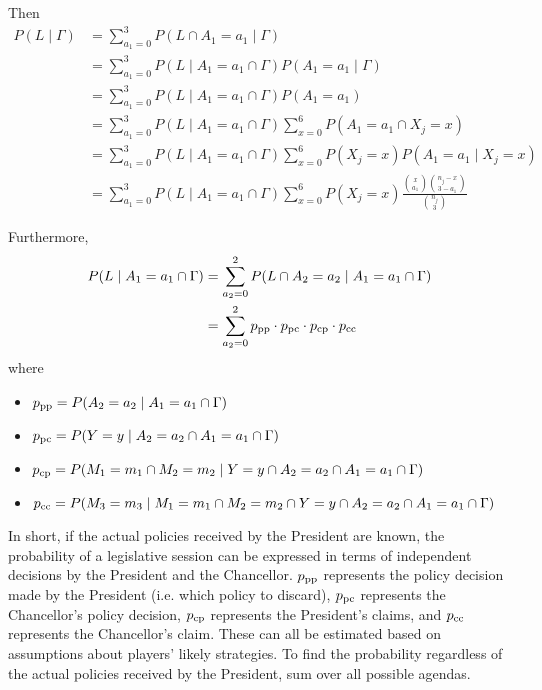 \documentclass[fleqn, 12pt, letterpaper]{article}
\newcommand{\up}[1]{\textnormal{#1}}
\begin{document}
Then
\begin{align*}
	P(L \mid \Gamma)
		&= \sum_{a_1=0}^3 P(L \cap A_1=a_1 \mid \Gamma) \\
		&= \sum_{a_1=0}^3 P(L \mid A_1=a_1 \cap \Gamma) P(A_1=a_1 \mid \Gamma) \\
		&= \sum_{a_1=0}^3 P(L \mid A_1=a_1 \cap \Gamma) P(A_1=a_1) \\
		&= \sum_{a_1=0}^3 P(L \mid A_1=a_1 \cap \Gamma) \sum_{x=0}^6 P(A_1=a_1 \cap X_j=x) \\
		&= \sum_{a_1=0}^3 P(L \mid A_1=a_1 \cap \Gamma) \sum_{x=0}^6 P(X_j=x) P(A_1=a_1 \mid X_j=x) \\
		&= \sum_{a_1=0}^3 P(L \mid A_1=a_1 \cap \Gamma) \sum_{x=0}^6 P(X_j=x) \frac{\binom{x}{a_1} \binom{n_j-x}{3-a_1}}{\binom{n_j}{3}}
\end{align*}

Furthermore,
\begin{align*}
	P(L \mid A_1=a_1 \cap \Gamma)
		&= \sum_{a_2=0}^2 P(L \cap A_2=a_2 \mid A_1=a_1 \cap \Gamma) \\
		&= \sum_{a_2=0}^2 p_\up{pp} \cdot p_\up{pc} \cdot p_\up{cp} \cdot p_\up{cc}
\end{align*}
where
\begin{itemize}
	\item $p_\up{pp} = P(A_2=a_2 \mid A_1=a_1 \cap \Gamma)$
	\item $p_\up{pc} = P(Y=y \mid A_2=a_2 \cap A_1=a_1 \cap \Gamma)$
	\item $p_\up{cp} = P(M_1=m_1 \cap M_2=m_2 \mid Y=y \cap A_2=a_2 \cap A_1=a_1 \cap \Gamma)$
	\item $p_\up{cc} = P(M_3=m_3 \mid M_1=m_1 \cap M_2=m_2 \cap Y=y \cap A_2=a_2 \cap A_1=a_1 \cap \Gamma)$
\end{itemize}

In short, if the actual policies received by the President are known, the probability of a legislative session can be expressed in terms of independent decisions by the President and the Chancellor. $p_\up{pp}$ represents the policy decision made by the President (i.e. which policy to discard), $p_\up{pc}$ represents the Chancellor's policy decision, $p_\up{cp}$ represents the President's claims, and $p_\up{cc}$ represents the Chancellor's claim. These can all be estimated based on assumptions about players' likely strategies. To find the probability regardless of the actual policies received by the President, sum over all possible agendas.
\end{document}
